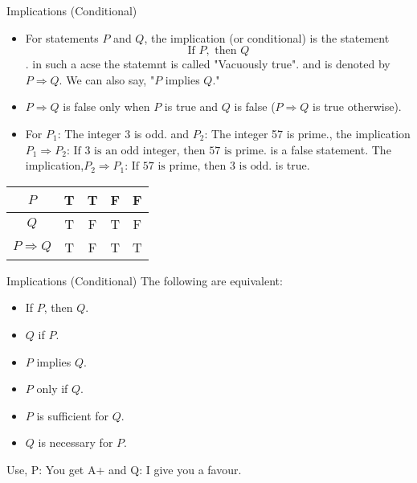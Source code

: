 \documentclass{beamer}
\begin{document}
\begin{frame}{Implications (Conditional)}
    \begin{itemize}
    \item For statements $P$ and $Q$, the implication (or conditional) is the statement
    $$\text{If } P, \text{ then } Q$$. in such a acse the statemnt is called "Vacuously true".
    and is denoted by $P \Rightarrow Q$. We can also say, "$P$ implies $Q$."
    \item $P \Rightarrow Q$ is false only when $P$ is true and $Q$ is false ($P \Rightarrow Q$ is true otherwise).
    \item For $P_1$: The integer 3 is odd. and $P_2$: The integer 57 is prime., the implication
    $P_1 \Rightarrow P_2 \text{: If 3 is an odd integer, then 57 is prime.}$
    is a false statement. The implication,$P_2 \Rightarrow P_1 \text{: If 57 is prime, then 3 is odd.}$
is true.
    \end{itemize}
    \begin{center}
\begin{tabular}{|c|c|c|c|c|}
    \hline
    $P$ & T & T & F & F \\
    \hline
    $Q$ & T & F & T & F \\
    \hline
    $P \Rightarrow Q$ & T & F & T & T \\
    \hline
\end{tabular}
\end{center}
\end{frame}

\begin{frame}{Implications (Conditional)}
    The following are equivalent: 
    \begin{itemize}
    
    \item If $P$, then $Q$.
    \item $Q$ if $P$.
    \item $P$ implies $Q$.
    \item $P$ only if $Q$.
    \item $P$ is sufficient for $Q$.
    \item $Q$ is necessary for $P$.
    \end{itemize}

Use, P: You get A+ and Q: I give you a favour.
\end{frame}
\end{document}
